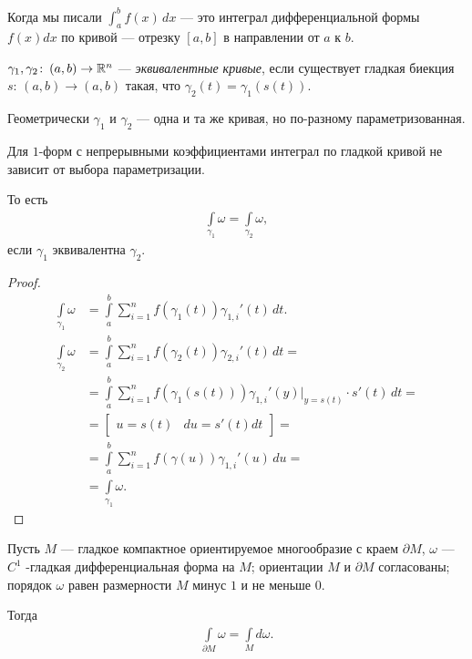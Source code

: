 Когда мы писали $\int_{a}^{b} f(x) \, dx $ --- это интеграл дифференциальной формы $f(x) dx$  по кривой --- отрезку $[a,b]$ в направлении от $a$ к $b$.

\begin{df}
 $\gamma_1, \gamma_2 \colon\, (a, b) \to \mathbb{R}^{n}$ --- \textit{эквивалентные кривые}, если существует гладкая биекция $s \colon\, (a,b) \to (a,b) $  такая, что $\gamma_2(t) = \gamma_1(s(t))$.
\end{df}

\begin{remrk*}
 Геометрически $\gamma_1$ и $\gamma_2$ --- одна и та же кривая, но по-разному параметризованная.
\end{remrk*}
\begin{claim}
 Для $1$-форм с непрерывными коэффициентами интеграл по гладкой кривой не зависит от выбора параметризации.  

 То есть
 \begin{align*}
  \int\limits_{\gamma_1} \omega = \int\limits_{\gamma_2} \omega
 ,\end{align*} если $\gamma_1$ эквивалентна $\gamma_2$.
\end{claim}
\begin{proof}
 \begin{align*}
  \int\limits_{\gamma_1} \omega &= \int\limits_{a}^{b} \sum_{i=1}^{n} f(\gamma_1(t))\gamma_{1,i}'(t) \, dt. \\
  \int\limits_{\gamma_2} \omega &= \int\limits_{a}^{b} \sum_{i=1}^{n} f(\gamma_2(t))\gamma_{2,i}'(t) \, dt =  \\
  &= \int\limits_{a}^{b} \sum_{i=1}^{n} f(\gamma_1(s(t))) \gamma_{1,i}'(y) \rvert_{y = s(t)} \cdot s'(t) \, dt = \\
  &= \begin{bmatrix}
   u = s(t) & du = s'(t) dt
  \end{bmatrix} = \\
  &= \int\limits_{a}^{b} \sum_{i=1}^{n} f(\gamma(u)) \gamma_{1,i}'(u) \, du = \\
  &= \int\limits_{\gamma_1} \omega
 .\end{align*}
\end{proof}
\begin{thm}[%
Стокса]
\label{theorem:stox}
 Пусть $M$  --- гладкое компактное ориентируемое многообразие с краем $\partial M$,  $\omega$  --- $C^{1}$ -гладкая дифференциальная форма на $M$; ориентации $M$  и $\partial M$  согласованы; порядок $\omega$ равен размерности $M$  минус $1$ и не меньше $0$.

 Тогда
 \begin{align}
  \label{equation:formula_stox}
  \int\limits_{\partial M} \omega = \int\limits_{M} d \omega
 .\end{align} 
\end{thm}


